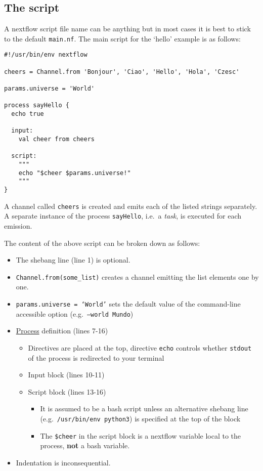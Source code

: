 \subsection{The script}

A nextflow script file name can be anything but in most cases it is best to stick to the default \texttt{main.nf}. 
The main script for the `hello' example is as follows:


\begin{lstlisting}
#!/usr/bin/env nextflow

cheers = Channel.from 'Bonjour', 'Ciao', 'Hello', 'Hola', 'Czesc'

params.universe = 'World'

process sayHello {
  echo true

  input:
    val cheer from cheers
    
  script:
    """
    echo "$cheer $params.universe!"
    """
}
\end{lstlisting}


A channel called \texttt{cheers} is created and emits each of the listed strings separately. 
A separate instance of the process \texttt{sayHello}, i.e.\ a \emph{task}, is executed for each emission. 

\begin{note}
The content of the above script can be broken down as follows:
\begin{itemize}
  \item The shebang line (line 1) is optional.
  \item \texttt{Channel.from(some\_list)} creates a channel emitting the list elements one by one.
  \item \texttt{params.universe = `World'} sets the default value of the command-line accessible option (e.g.\ \texttt{--world Mundo})
  \item \href{https://www.nextflow.io/docs/latest/process.html}{Process} definition (lines 7-16)
  \begin{itemize}
    \item Directives are placed at the top, directive \texttt{echo} controls whether \texttt{stdout} of the process is redirected to your terminal
    \item Input block (lines 10-11) 
    \item Script block (lines 13-16)
    \begin{itemize}
     \item It is assumed to be a bash script unless an alternative shebang line (e.g.\  \texttt{/usr/bin/env python3}) is specified at the top of the block 
     \item The \texttt{\$cheer} in the script block is a nextflow variable local to the process, \textbf{not} a bash variable.
    \end{itemize}
  \end{itemize}
  
  \item Indentation is inconsequential. 
\end{itemize}

\end{note}


